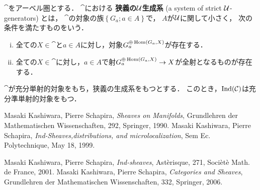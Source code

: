 \begin{Definition}
    \(\cat\)をアーベル圏とする．
    \(\cat\)における
    \textbf{狭義の\(\mathcal{U}\)生成系} (a system of 
    strict \(\mathcal{U}\)-generators) とは，
    \(\cat\)の対象の族\(\left\{G_a;a\in{A}\right\}\)で，
    \(A\)が\(\mathcal{U}\)に関して小さく，
    次の条件を満たすものをいう．
    \begin{enumerate}[(i)]
        \item 全ての\(X\in\cat\)と\(a\in{A}\)に対し，対象\(G_a^{\oplus\mathop{\mathrm{Hom}}\nolimits(G_a,X)}\)が存在する．
        \item 全ての\(X\in\cat\)に対し，\(a\in{A}\)で射\(G_a^{\oplus\mathop{\mathrm{Hom}}\nolimits(G_a,X)}\to{X}\)が全射となるものが存在する．
    \end{enumerate}
\end{Definition}
\begin{Fact}
    \(\cat\)が充分単射的対象をもち，狭義の生成系をもつとする．
    このとき，\(\mathop{\mathrm{Ind}}(\mathcal{C})\)は充分準単射的対象をもつ．
\end{Fact}




































\begin{thebibliography}{20} 
     Masaki Kashiwara, Pierre Schapira, 
    \textit{Sheaves on Manifolds}, 
    Grundlehren der Mathematischen Wissenschaften, 292, Springer, 1990.
     Masaki Kashiwara, Pierre Schapira, 
    \textit{Ind-Sheaves,distributions, and microlocalization}, 
    Sem Ec. Polytechnique, May 18, 1999.
    
     Masaki Kashiwara, Pierre Schapira, 
    \textit{Ind-sheaves}, 
    Ast\`erisque, 271, Soci\`et\`e Math. de France, 2001.
     Masaki Kashiwara, Pierre Schapira, 
    \textit{Categories and Sheaves}, 
    Grundlehren der Mathematischen Wissenschaften, 332, Springer, 2006.
\end{thebibliography}




